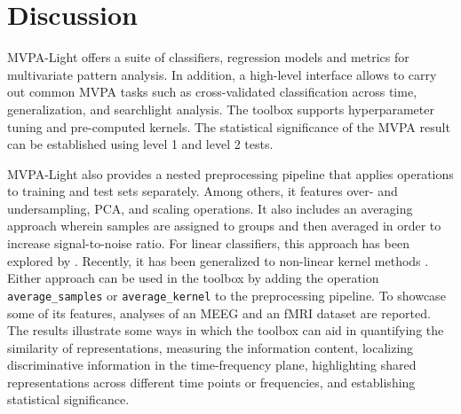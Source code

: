 \documentclass[utf8]{frontiersSCNS} %
\newcommand{\ttt}[1]{\texttt{#1}}
\begin{document}
\section{Discussion}

MVPA-Light offers a suite of classifiers, regression models and metrics for multivariate pattern analysis. In addition, a high-level interface allows to carry out common MVPA tasks such as cross-validated classification across time,  generalization, and searchlight analysis. The toolbox supports hyperparameter tuning and pre-computed kernels. The statistical significance of the MVPA result can be established using level 1 and level 2 tests.

MVPA-Light also provides a nested preprocessing pipeline that applies operations to training and test sets separately. Among others, it features over- and undersampling, PCA, and scaling operations. It also includes an averaging approach wherein samples are assigned to groups and then averaged in order to increase signal-to-noise ratio. For linear classifiers, this approach has been explored by \citep{Cichy2015,Cichy2017MultivariateSpace}. Recently, it has been generalized to non-linear kernel methods \citep{Treder2018}. Either approach can be used in the toolbox by adding the operation \ttt{average\_samples} or \ttt{average\_kernel} to the preprocessing pipeline.
To showcase some of its features, analyses of an MEEG \citep{Wakeman2015ADataset} and an fMRI \citep{Haxby2001} dataset are reported. The results illustrate some ways in which the toolbox can aid in quantifying the similarity of representations, measuring the information content, localizing discriminative information in the time-frequency plane, highlighting shared representations across different time points or frequencies, and establishing statistical significance.
\end{document}
